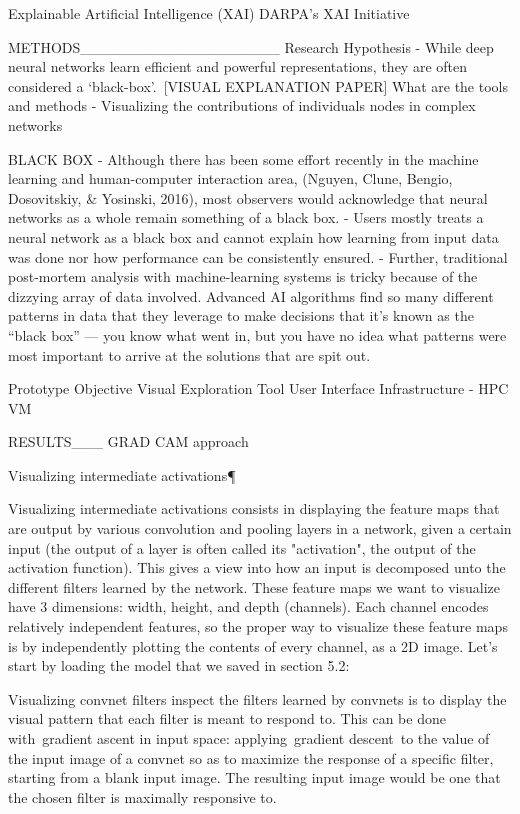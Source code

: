 Explainable Artificial Intelligence (XAI)
DARPA's XAI Initiative


METHODS___________________
Research Hypothesis
- While deep neural networks learn efficient and powerful representations, they are often considered a ‘black-box’. [VISUAL EXPLANATION PAPER] What are the tools and methods 
- Visualizing the contributions of individuals nodes in complex networks

BLACK BOX
- Although there has been some effort recently in the machine learning and human-computer interaction area, (Nguyen, Clune, Bengio, Dosovitskiy, & Yosinski, 2016), most observers would acknowledge that neural networks as a whole remain something of a black box.
- Users mostly treats a neural network as a black box and cannot explain how learning from input data was done nor how performance can be consistently ensured.
- Further, traditional post-mortem analysis with machine-learning systems is tricky because of the dizzying array of data involved. Advanced AI algorithms find so many different patterns in data that they leverage to make decisions that it’s known as the “black box” — you know what went in, but you have no idea what patterns were most important to arrive at the solutions that are spit out.

Prototype Objective
Visual Exploration Tool
User Interface
Infrastructure - HPC VM

RESULTS___
GRAD CAM approach

Visualizing intermediate activations¶

Visualizing intermediate activations consists in displaying the feature maps that are output by various convolution and pooling layers in a network, given a certain input (the output of a layer is often called its "activation", the output of the activation function). This gives a view into how an input is decomposed unto the different filters learned by the network. These feature maps we want to visualize have 3 dimensions: width, height, and depth (channels). Each channel encodes relatively independent features, so the proper way to visualize these feature maps is by independently plotting the contents of every channel, as a 2D image. Let's start by loading the model that we saved in section 5.2:

Visualizing convnet filters
inspect the filters learned by convnets is to display the visual pattern that each filter is meant to respond to. This can be done with gradient ascent in input space: applying gradient descent to the value of the input image of a convnet so as to maximize the response of a specific filter, starting from a blank input image. The resulting input image would be one that the chosen filter is maximally responsive to.

